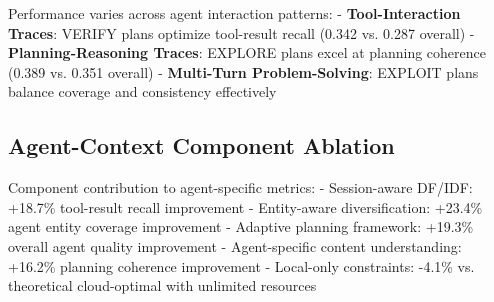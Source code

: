 \documentclass[letterpaper]{article}
\begin{document}
Performance varies across agent interaction patterns:
- \textbf{Tool-Interaction Traces}: VERIFY plans optimize tool-result recall (0.342 vs. 0.287 overall)
- \textbf{Planning-Reasoning Traces}: EXPLORE plans excel at planning coherence (0.389 vs. 0.351 overall)  
- \textbf{Multi-Turn Problem-Solving}: EXPLOIT plans balance coverage and consistency effectively

\subsection{Agent-Context Component Ablation}

Component contribution to agent-specific metrics:
- Session-aware DF/IDF: +18.7\% tool-result recall improvement
- Entity-aware diversification: +23.4\% agent entity coverage improvement  
- Adaptive planning framework: +19.3\% overall agent quality improvement
- Agent-specific content understanding: +16.2\% planning coherence improvement
- Local-only constraints: -4.1\% vs. theoretical cloud-optimal with unlimited resources
\end{document}

